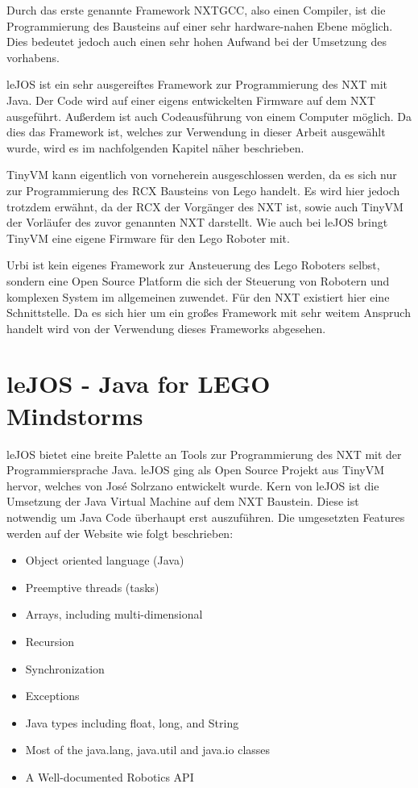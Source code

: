 Durch das erste genannte Framework NXTGCC, also einen Compiler, ist die Programmierung des Bausteins auf einer sehr hardware-nahen Ebene m\"oglich. Dies bedeutet jedoch auch einen sehr hohen Aufwand bei der Umsetzung des vorhabens.
\par\smallskip
leJOS ist ein sehr ausgereiftes Framework zur Programmierung des NXT mit Java. Der Code wird auf einer eigens entwickelten Firmware auf dem NXT ausgef\"uhrt. Außerdem ist auch Codeausf\"uhrung von einem Computer m\"oglich. Da dies das Framework ist, welches zur Verwendung in dieser Arbeit ausgew\"ahlt wurde, wird es im nachfolgenden Kapitel n\"aher beschrieben.
\par\smallskip
TinyVM kann eigentlich von vorneherein ausgeschlossen werden, da es sich nur zur Programmierung des RCX Bausteins von Lego handelt. Es wird hier jedoch trotzdem erw\"ahnt, da der RCX der Vorg\"anger des NXT ist, sowie auch TinyVM der Vorl\"aufer des zuvor genannten NXT darstellt. Wie auch bei leJOS bringt TinyVM eine eigene Firmware f\"ur den Lego Roboter mit.
\par\smallskip
Urbi ist kein eigenes Framework zur Ansteuerung des Lego Roboters selbst, sondern eine Open Source Platform die sich der Steuerung von Robotern und komplexen System im allgemeinen zuwendet. F\"ur den NXT existiert hier eine Schnittstelle. Da es sich hier um ein großes Framework mit sehr weitem Anspruch handelt wird von der Verwendung dieses Frameworks abgesehen.

\section{leJOS - Java for LEGO Mindstorms}

leJOS bietet eine breite Palette an Tools zur Programmierung des NXT mit der Programmiersprache Java. leJOS ging als Open Source Projekt aus TinyVM hervor, welches von Jos\'e Solrzano entwickelt wurde. Kern von leJOS ist die Umsetzung der Java Virtual Machine auf dem NXT Baustein. Diese ist notwendig um Java Code \"uberhaupt erst auszuf\"uhren. Die umgesetzten Features werden auf der Website wie folgt beschrieben\footnotemark[28] :


\begin{itemize}
  \item Object oriented language (Java)
  \item Preemptive threads (tasks)
  \item Arrays, including multi-dimensional
  \item Recursion
  \item Synchronization
  \item Exceptions
  \item Java types including float, long, and String
  \item Most of the java.lang, java.util and java.io classes
  \item A Well-documented Robotics API
\end{itemize}

